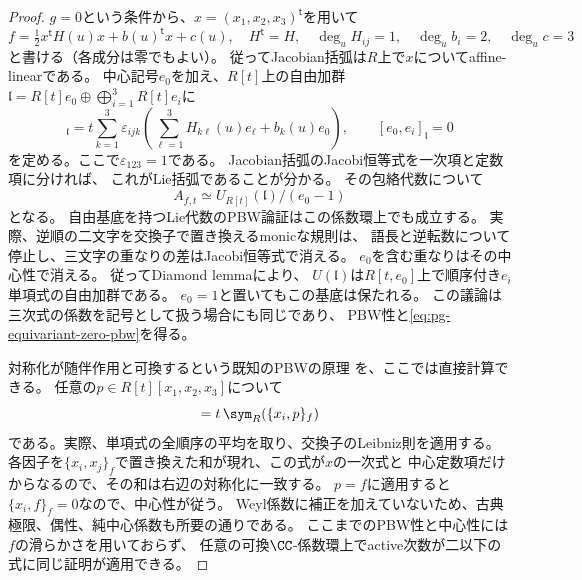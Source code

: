 \begin{proof}
$g=0$という条件から、$x=(x_1,x_2,x_3)^{\mathsf t}$を用いて
\begin{equation}
 f=\tfrac12x^{\mathsf t}H(u)x+b(u)^{\mathsf t}x+c(u),
 \quad H^{\mathsf t}=H,\quad
 \deg_u H_{ij}=1,\quad \deg_u b_i=2,\quad\deg_u c=3
 \label{eq:pg-equivariant-zero-quadratic-form}
\end{equation}
と書ける（各成分は零でもよい）。
従ってJacobian括弧は$R$上で$x$についてaffine-linearである。
中心記号$e_0$を加え、$R[t]$上の自由加群
$\mathfrak l=R[t]e_0\oplus\bigoplus_{i=1}^3R[t]e_i$に
\begin{equation}
 [e_i,e_j]_{\mathfrak l}
 =t\sum_{k=1}^3\varepsilon_{ijk}
       \left(\sum_{\ell=1}^3 H_{k\ell}(u)e_\ell+b_k(u)e_0\right),
 \qquad [e_0,e_i]_{\mathfrak l}=0
 \label{eq:pg-equivariant-zero-lie-algebra}
\end{equation}
を定める。ここで$\varepsilon_{123}=1$である。
Jacobian括弧のJacobi恒等式を一次項と定数項に分ければ、
これがLie括弧であることが分かる。
その包絡代数について
\begin{equation}
 A_{f,t}\simeq U_{R[t]}(\mathfrak l)/(e_0-1)
 \label{eq:pg-equivariant-zero-enveloping}
\end{equation}
となる。
自由基底を持つLie代数のPBW論証はこの係数環上でも成立する。
実際、逆順の二文字を交換子で置き換えるmonicな規則は、
語長と逆転数について停止し、三文字の重なりの差はJacobi恒等式で消える。
$e_0$を含む重なりはその中心性で消える。
従ってDiamond lemma\cite[Theorem~1.2]{BergNE12}により、
$U(\mathfrak l)$は$R[t,e_0]$上で順序付き$e_i$単項式の自由加群である。
$e_0=1$と置いてもこの基底は保たれる。
この議論は三次式の係数を記号として扱う場合にも同じであり、
PBW性と\eqref{eq:pg-equivariant-zero-pbw}を得る。

対称化が随伴作用と可換するという既知のPBWの原理
\cite[Corollaries~13.7--13.8, p.~75]{PEtingofLie}を、ここでは直接計算できる。
任意の$p\in R[t][x_1,x_2,x_3]$について
\begin{equation}
 [x_i,\sym_R(p)]=t\,\sym_R(\{x_i,p\}_f)
 \label{eq:pg-equivariant-zero-exact-commutator}
\end{equation}
である。実際、単項式の全順序の平均を取り、交換子のLeibniz則を適用する。
各因子を$\{x_i,x_j\}_f$で置き換えた和が現れ、この式が$x$の一次式と
中心定数項だけからなるので、その和は右辺の対称化に一致する。
$p=f$に適用すると$\{x_i,f\}_f=0$なので、中心性が従う。
Weyl係数に補正を加えていないため、古典極限、偶性、純中心係数も所要の通りである。
ここまでのPBW性と中心性には$f$の滑らかさを用いておらず、
任意の可換$\CC$-係数環上でactive次数が二以下の式に同じ証明が適用できる。


\end{proof}
